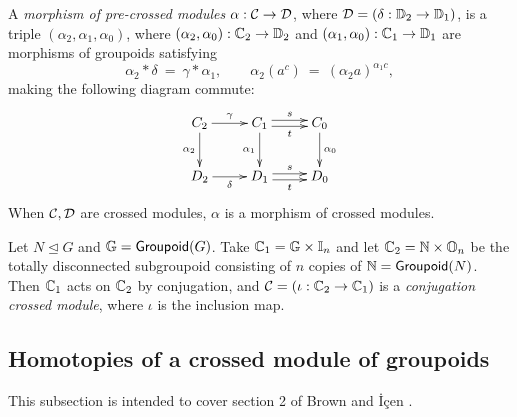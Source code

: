\medskip 
{}
A \emph{morphism of pre-crossed modules} $\alpha : \mathcal{C} \to \mathcal{D}$, 
where $\mathcal{D} = (\delta : \mathbb{D}_2 \to \mathbb{D}_1)$, 
is a triple  $(\alpha_2, \alpha_1, \alpha_0)$, 
where $(\alpha_2,\alpha_0) : \mathbb{C}_2 \to \mathbb{D}_2$ 
and $(\alpha_1,\alpha_0) : \mathbb{C}_1 \to \mathbb{D}_1$ 
are morphisms of groupoids satisfying 
$$
\alpha_2*\delta ~=~ \gamma*\alpha_1, \qquad
\alpha_2(a^c) ~=~ (\alpha_2 a)^{\alpha_1 c},
$$
making the following diagram commute:
$$
\xymatrix{ 
  C_2 \ar[r]^{\gamma} \ar[d]_{\alpha_2}
    &  C_1 \ar[d]_{\alpha_1} \ar[r]<+0.5ex>^s \ar[r]<-0.5ex>_t 
       &  C_0  \ar[d]^{\alpha_0}  \\
  D_2 \ar[r]_{\delta} 
    &  D_1 \ar[r]<+0.5ex>^s \ar[r]<-0.5ex>_t 
       &  D_0
}
$$
When $\mathcal{C},\mathcal{D}$ are crossed modules, 
$\alpha$ is a morphism of crossed modules.


\begin{example}
Let $N \unlhd G$ and $\mathbb{G} = {\sf Groupoid}(G)$. 
Take $\mathbb{C}_1 = \mathbb{G}\times\mathbb{I}_n$ and let $\mathbb{C}_2 = \mathbb{N} \times \mathbb{O}_n$ 
be the totally disconnected subgroupoid 
consisting of $n$ copies of $\mathbb{N}={\sf Groupoid}(N)$. 
Then $\mathbb{C}_1$ acts on $\mathbb{C}_2$ by conjugation, 
and $\mathcal{C} = (\iota : \mathbb{C}_2 \to \mathbb{C}_1)$ is a 
\emph{conjugation crossed module}, where $\iota$ is the inclusion map. 
\end{example}



\newpage
\subsection{Homotopies of a crossed module of groupoids}

This subsection is intended to cover section 2 of
Brown and \.{I}\c{c}en \cite{brow:icen}.

